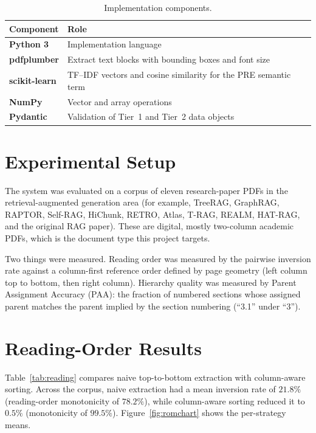 \documentclass[12pt,a4paper]{report}
\begin{document}
\begin{table}[!htbp]
\centering
\caption{Implementation components.}
\label{tab:stack}
\renewcommand{\arraystretch}{1.25}
{\small
\begin{tabularx}{\textwidth}{@{} >{\bfseries}l X @{}}
\toprule
Component & Role \\ \midrule
Python 3 & Implementation language \\
pdfplumber & Extract text blocks with bounding boxes and font size \\
scikit-learn & TF--IDF vectors and cosine similarity for the PRE semantic term \\
NumPy & Vector and array operations \\
Pydantic & Validation of Tier~1 and Tier~2 data objects \\ \bottomrule
\end{tabularx}}
\end{table}

\section{Experimental Setup}
The system was evaluated on a corpus of eleven research-paper PDFs in the
retrieval-augmented generation area (for example, TreeRAG, GraphRAG, RAPTOR, Self-RAG,
HiChunk, RETRO, Atlas, T-RAG, REALM, HAT-RAG, and the original RAG paper). These are
digital, mostly two-column academic PDFs, which is the document type this project
targets.

Two things were measured. Reading order was measured by the pairwise inversion rate
against a column-first reference order defined by page geometry (left column top to
bottom, then right column). Hierarchy quality was measured by Parent Assignment
Accuracy (PAA): the fraction of numbered sections whose assigned parent matches the
parent implied by the section numbering (``3.1'' under ``3'').

\section{Reading-Order Results}
Table~\ref{tab:reading} compares naive top-to-bottom extraction with column-aware
sorting. Across the corpus, naive extraction had a mean inversion rate of $21.8\%$
(reading-order monotonicity of $78.2\%$), while column-aware sorting reduced it to
$0.5\%$ (monotonicity of $99.5\%$). Figure~\ref{fig:romchart} shows the per-strategy
means.
\end{document}
